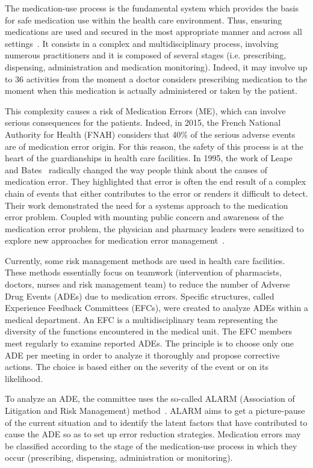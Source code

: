 \documentclass[preprint,3p,times,number]{elsarticle}
\begin{document}
The medication-use process is the fundamental system which provides the basis for safe medication use within the health care environment. Thus, ensuring medications are used and secured in the most appropriate manner and across all settings~\cite{Practice2019}. It consists in a complex and multidisciplinary process, involving numerous practitioners and it is composed of several stages (i.e. prescribing, dispensing, administration and medication monitoring). Indeed, it may involve up to 36 activities from the moment a doctor considers prescribing medication to the moment when this medication is actually administered or taken by the patient. 

This complexity causes a risk of Medication Errors (ME), which can involve serious consequences for the patients. Indeed, in 2015, the French National Authority for Health (FNAH) considers that 40\% of the serious adverse events are of medication error origin. For this reason, the safety of this process is at the heart of the guardianships in health care facilities. In 1995, the work of Leape and Bates~\cite{leape1995} radically changed the way people think about the causes of medication error. They highlighted that error is often the end result of a complex chain of events that either contributes to the error or renders it difficult to detect. Their work demonstrated the need for a systems approach to the medication error problem. Coupled with mounting public concern and awareness of the medication error problem, the physician and pharmacy leaders were sensitized to explore new approaches for medication error management~\cite{bevilacqua2018}.

Currently, some risk management methods are used in health care facilities. These methods essentially focus on teamwork (intervention of pharmacists, doctors, nurses and risk management team) to reduce the number of Adverse Drug Events (ADEs) due to medication errors. Specific structures, called Experience Feedback Committees (EFCs), were created to analyze ADEs within a medical department. An EFC is a multidisciplinary team representing the diversity of the functions encountered in the medical unit. The EFC members meet regularly to examine reported ADEs. The principle is to choose only one ADE per meeting in order to analyze it thoroughly and propose corrective actions. The choice is based either on the severity of the event or on its likelihood.

To analyze an ADE, the committee uses the so-called ALARM (Association of Litigation and Risk Management) method~\cite{vincent2000}. ALARM aims to get a picture-pause of the current situation and to identify the latent factors that have contributed to cause the ADE so as to set up error reduction strategies. Medication errors may be classified according to the stage of the medication-use process in which they occur (prescribing, dispensing, administration or monitoring).
\end{document}
